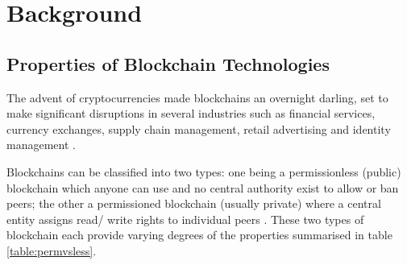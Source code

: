 
\chapter{Background}

    \graphicspath{{Chapter2/Figs/Raster/}{Chapter2/Figs/PDF/}{Chapter2/Figs/}}

\section{Properties of Blockchain Technologies}

The advent of cryptocurrencies made blockchains an overnight darling, set to make significant disruptions 
in several industries such as financial services, currency exchanges, supply chain management, retail 
advertising and identity management \citep{forbes2017industries}.

Blockchains can be classified into two types: one being a permissionless (public) blockchain which anyone can 
use and no central authority exist to allow or ban peers; the other a permissioned blockchain (usually private)
where a central entity assigns read/ write rights to individual peers \citep[p.1]{wust2017you}. These two types of 
blockchain each provide varying degrees of the properties summarised in table \ref{table:permvsless}.

